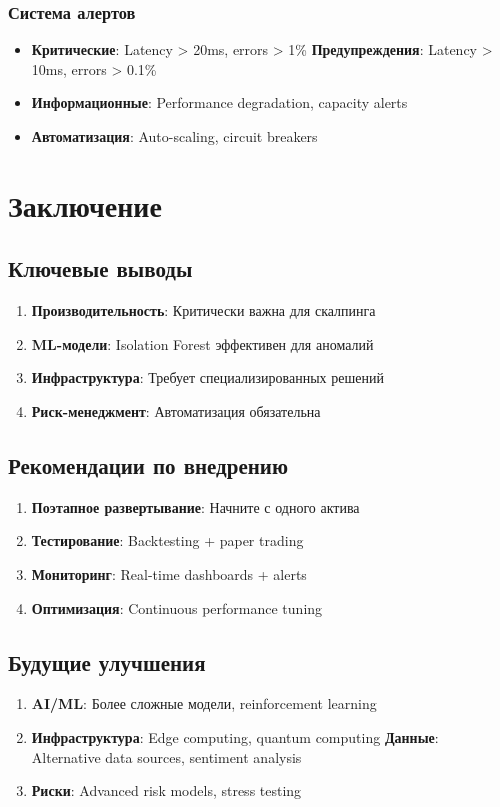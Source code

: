 \documentclass[12pt,a4paper]{article}
\begin{document}
\subsubsection{Система алертов}
\begin{itemize}
    \item \textbf{Критические}: Latency > 20ms, errors > 1\%
    \textbf{Предупреждения}: Latency > 10ms, errors > 0.1\%
    \item \textbf{Информационные}: Performance degradation, capacity alerts
    \item \textbf{Автоматизация}: Auto-scaling, circuit breakers
\end{itemize}

\section{Заключение}

\subsection{Ключевые выводы}
\begin{enumerate}
    \item \textbf{Производительность}: Критически важна для скалпинга
    \item \textbf{ML-модели}: Isolation Forest эффективен для аномалий
    \item \textbf{Инфраструктура}: Требует специализированных решений
    \item \textbf{Риск-менеджмент}: Автоматизация обязательна
\end{enumerate}

\subsection{Рекомендации по внедрению}
\begin{enumerate}
    \item \textbf{Поэтапное развертывание}: Начните с одного актива
    \item \textbf{Тестирование}: Backtesting + paper trading
    \item \textbf{Мониторинг}: Real-time dashboards + alerts
    \item \textbf{Оптимизация}: Continuous performance tuning
\end{enumerate}

\subsection{Будущие улучшения}
\begin{enumerate}
    \item \textbf{AI/ML}: Более сложные модели, reinforcement learning
    \item \textbf{Инфраструктура}: Edge computing, quantum computing
    \textbf{Данные}: Alternative data sources, sentiment analysis
    \item \textbf{Риски}: Advanced risk models, stress testing
\end{enumerate}
\end{document}
